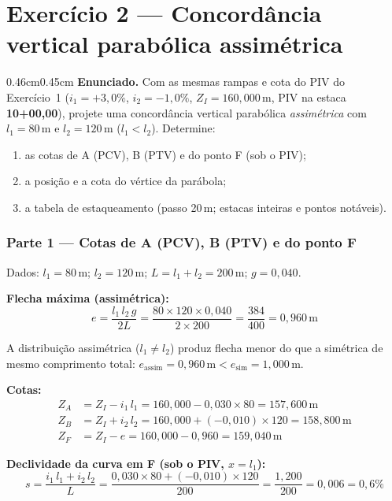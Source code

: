 \documentclass[12pt,letterpaper]{article}
\newenvironment{corpo}{\begin{adjustwidth}{0.46cm}{0.45cm}\justifying}{\end{adjustwidth}}
\begin{document}
\newpage
\section*{Exercício 2 — Concordância vertical parabólica assimétrica}

\begin{corpo}
\textbf{Enunciado.} Com as mesmas rampas e cota do PIV do Exercício~1 ($i_1 = {+}3{,}0\%$, $i_2 = {-}1{,}0\%$, $Z_I = 160{,}000\,\text{m}$, PIV na estaca \textbf{10+00,00}), projete uma concordância vertical parabólica \emph{assimétrica} com $l_1 = 80\,\text{m}$ e $l_2 = 120\,\text{m}$ ($l_1 < l_2$). Determine:
\begin{enumerate}
  \item as cotas de A (PCV), B (PTV) e do ponto F (sob o PIV);
  \item a posição e a cota do vértice da parábola;
  \item a tabela de estaqueamento (passo 20\,m; estacas inteiras e pontos notáveis).
\end{enumerate}

\subsubsection*{Parte 1 — Cotas de A (PCV), B (PTV) e do ponto F}

Dados: $l_1 = 80\,\text{m}$; $l_2 = 120\,\text{m}$; $L = l_1 + l_2 = 200\,\text{m}$; $g = 0{,}040$.

\textbf{Flecha máxima (assimétrica):}
\[
  e = \frac{l_1\,l_2\,g}{2L} = \frac{80 \times 120 \times 0{,}040}{2 \times 200} = \frac{384}{400} = 0{,}960\,\text{m}
\]

A distribuição assimétrica ($l_1 \neq l_2$) produz flecha menor do que a simétrica de mesmo comprimento total: $e_{\text{assim}} = 0{,}960\,\text{m} < e_{\text{sim}} = 1{,}000\,\text{m}$.

\textbf{Cotas:}
\begin{align*}
  Z_A &= Z_I - i_1\,l_1 = 160{,}000 - 0{,}030 \times 80 = 157{,}600\,\text{m}\\[4pt]
  Z_B &= Z_I + i_2\,l_2 = 160{,}000 + (-0{,}010) \times 120 = 158{,}800\,\text{m}\\[4pt]
  Z_F &= Z_I - e = 160{,}000 - 0{,}960 = 159{,}040\,\text{m}
\end{align*}

\textbf{Declividade da curva em F (sob o PIV, $x = l_1$):}
\[
  s = \frac{i_1\,l_1 + i_2\,l_2}{L} = \frac{0{,}030 \times 80 + (-0{,}010) \times 120}{200} = \frac{1{,}200}{200} = 0{,}006 = 0{,}6\%
\]


\end{corpo}
\end{document}
